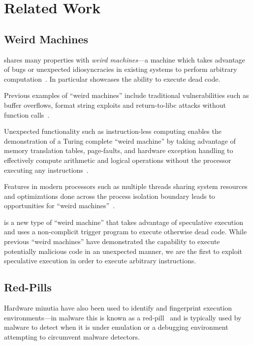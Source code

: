 \section{Related Work}
\label{sec:related-work}


\subsection{Weird Machines}

\speculake shares many properties with \textit{weird machines}---a machine which
takes advantage of bugs or unexpected idiosyncracies in existing systems to
perform arbitrary
computation~\cite{weird_machines,bratus2011exploit}. In
particular \speculake showcases the ability to execute dead code.

Previous examples of ``weird machines'' include traditional vulnerabilities such
as buffer overflows, format string exploits and return-to-libc attacks without
function calls~\cite{buffer_overflow, format_string_exploit,
shacham2007geometry}. 

Unexpected functionality such as instruction-less computing enables the
demonstration of a Turing complete ``weird machine'' by taking advantage of
memory translation tables, page-faults, and hardware exception handling to
effectively compute arithmetic and logical operations without the processor
executing any instructions~\cite{bangert2013page}.

Features in modern processors such as multiple threads sharing system resources
and optimizations done across the process isolation boundary leads to
opportunities for ``weird machines''~\cite{d2015exploiting}.

\speculake is a new type of ``weird machine'' that takes advantage of
speculative execution and uses a non-complicit trigger program to execute
otherwise dead code. While previous ``weird machines'' have demonstrated the
capability to execute potentially malicious code in an unexpected manner, we are
the first to exploit speculative execution in order to execute arbitrary
instructions.

\subsection{Red-Pills}
Hardware minutia have also been used to identify and fingerprint execution
environments---in malware this is known as a red-pill~\cite{red-pill} and is
typically used by malware to detect when it is under emulation or a debugging
environment~\cite{lindorfer2011detecting, balzarotti2010efficient,
paleari2009fistful} attempting to circumvent malware detectors.


